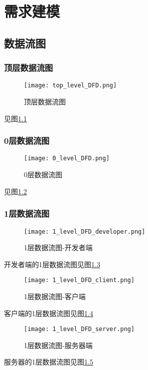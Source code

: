 \chapter{需求建模 }
\section{数据流图}
\subsection{顶层数据流图}
\begin{figure}[ht]
	\centering
	\texttt{[image: top\_level\_DFD.png]}
	\caption{顶层数据流图} \label{fig:top_level_DFD}
\end{figure}
见图\ref{fig:top_level_DFD}

\subsection{0层数据流图}
\begin{figure}[ht]
	\centering
	\texttt{[image: 0\_level\_DFD.png]}
	\caption{0层数据流图} \label{fig:0_level_DFD}
\end{figure}
见图\ref{fig:0_level_DFD}

\subsection{1层数据流图}
\begin{figure}[ht]
	\centering
	\texttt{[image: 1\_level\_DFD\_developer.png]}
	\caption{1层数据流图-开发者端} \label{fig:1_level_DFD_dveloper}
\end{figure}
开发者端的1层数据流图见图\ref{fig:1_level_DFD_dveloper}

\begin{figure}[ht]
	\centering
	\texttt{[image: 1\_level\_DFD\_client.png]}
	\caption{1层数据流图-客户端} \label{fig:1_level_DFD_client}
\end{figure}

客户端的1层数据流图见图\ref{fig:1_level_DFD_client}


\begin{figure}[ht]
	\centering
	\texttt{[image: 1\_level\_DFD\_server.png]}
	\caption{1层数据流图-服务器端} \label{fig:1_level_DFD_server}
\end{figure}

服务器的1层数据流图见图\ref{fig:1_level_DFD_server}

